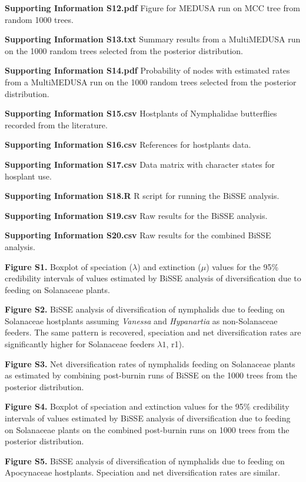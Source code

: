 \documentclass[10pt]{article}
\begin{document}
{\textbf{Supporting Information S12.pdf}} Figure for MEDUSA run on MCC
tree from random 1000 trees.

{\textbf{Supporting Information S13.txt}} Summary results from a
MultiMEDUSA run on the 1000 random trees selected from the posterior
distribution.

{\textbf{Supporting Information S14.pdf}} Probability of nodes with
estimated rates from a MultiMEDUSA run on the 1000 random trees selected
from the posterior distribution.

{\textbf{Supporting Information S15.csv}} Hostplants of Nymphalidae
butterflies recorded from the literature.

{\textbf{Supporting Information S16.csv}} References for hostplants
data.

{\textbf{Supporting Information S17.csv}} Data matrix with character
states for hosplant use.

{\textbf{Supporting Information S18.R}} R script for running the BiSSE
analysis.

{\textbf{Supporting Information S19.csv}} Raw results for the BiSSE
analysis.

{\textbf{Supporting Information S20.csv}} Raw results for the combined
BiSSE analysis.

{\textbf{Figure S1.}} Boxplot of speciation (\(\lambda\)) and extinction
(\(\mu\)) values for the 95\% credibility intervals of values estimated
by BiSSE analysis of diversification due to feeding on Solanaceae
plants.

{\textbf{Figure S2.}} BiSSE analysis of diversification of nymphalids
due to feeding on Solanaceae hostplants assuming \emph{Vanessa} and
\emph{Hypanartia} as non-Solanaceae feeders. The same pattern is
recovered, speciation and net diversification rates are significantly
higher for Solanaceae feeders \(\lambda1\), r1).

{\textbf{Figure S3.}} Net diversification rates of nymphalids feeding on
Solanaceae plants as estimated by combining post-burnin runs of BiSSE on
the 1000 trees from the posterior distribution.

{\textbf{Figure S4.}} Boxplot of speciation and extinction values for
the 95\% credibility intervals of values estimated by BiSSE analysis of
diversification due to feeding on Solanaceae plants on the combined
post-burnin runs on 1000 trees from the posterior distribution.

{\textbf{Figure S5.}} BiSSE analysis of diversification of nymphalids
due to feeding on Apocynaceae hostplants. Speciation and net
diversification rates are similar.
\end{document}
